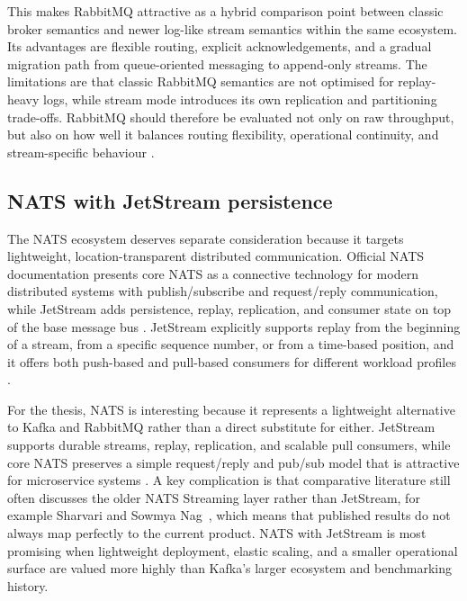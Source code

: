 This makes RabbitMQ attractive as a hybrid comparison point between classic broker semantics and newer log-like stream semantics within the same ecosystem. Its advantages are flexible routing, explicit acknowledgements, and a gradual migration path from queue-oriented messaging to append-only streams. The limitations are that classic RabbitMQ semantics are not optimised for replay-heavy logs, while stream mode introduces its own replication and partitioning trade-offs. RabbitMQ should therefore be evaluated not only on raw throughput, but also on how well it balances routing flexibility, operational continuity, and stream-specific behaviour \cite{dobbelaere2017kafkarabbitmq,sharvari2019messaging,rabbitmq2026streams}.

\subsection{NATS with JetStream persistence}

The NATS ecosystem deserves separate consideration because it targets lightweight, location-transparent distributed communication. Official NATS documentation presents core NATS as a connective technology for modern distributed systems with publish/subscribe and request/reply communication, while JetStream adds persistence, replay, replication, and consumer state on top of the base message bus \cite{nats2026overview,nats2026reqreply,nats2026jetstream}. JetStream explicitly supports replay from the beginning of a stream, from a specific sequence number, or from a time-based position, and it offers both push-based and pull-based consumers for different workload profiles \cite{nats2026jetstream}.

For the thesis, NATS is interesting because it represents a lightweight alternative to Kafka and RabbitMQ rather than a direct substitute for either. JetStream supports durable streams, replay, replication, and scalable pull consumers, while core NATS preserves a simple request/reply and pub/sub model that is attractive for microservice systems \cite{nats2026reqreply,nats2026jetstream}. A key complication is that comparative literature still often discusses the older NATS Streaming layer rather than JetStream, for example Sharvari and Sowmya Nag~\cite{sharvari2019messaging}, which means that published results do not always map perfectly to the current product. NATS with JetStream is most promising when lightweight deployment, elastic scaling, and a smaller operational surface are valued more highly than Kafka's larger ecosystem and benchmarking history.

